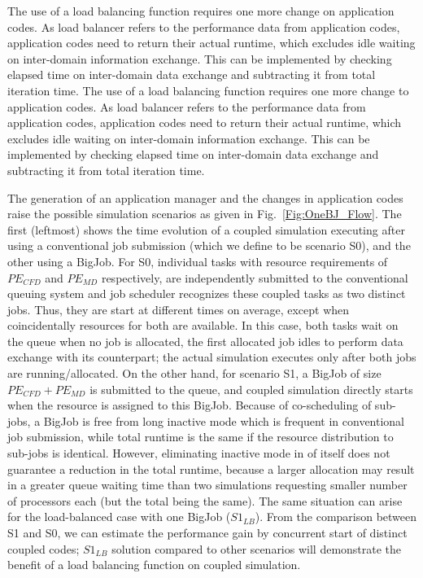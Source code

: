 \documentclass[conference,final]{IEEEtran}
\begin{document}
The use of a load balancing function requires one more change on application codes. As load balancer refers to the performance data from application codes, application codes need to return their actual runtime, which excludes idle waiting on inter-domain information exchange. This can be implemented by checking elapsed time on inter-domain data exchange and subtracting it from total iteration time.  The use of a load balancing function requires one more change to application codes. As load balancer refers to the performance data from application codes, application codes need to return their actual runtime, which excludes idle waiting on inter-domain information exchange. This can be implemented by checking elapsed time on inter-domain data exchange and subtracting it from total iteration time.


The generation of an application manager and the changes in application codes raise the possible simulation scenarios as given in Fig.~\ref{Fig:OneBJ_Flow}. The first (leftmost) shows the time evolution of a coupled simulation executing after using a conventional job submission (which we define to be scenario S0), and the other using a BigJob. For S0, individual tasks with resource requirements of $PE_{CFD}$ and $PE_{MD}$ respectively, are independently submitted to the conventional queuing system and job scheduler recognizes these coupled tasks as two distinct jobs. Thus, they are start at different times on average, except when coincidentally resources for both are available. In this case, both tasks wait on the queue when no job is allocated, the first allocated job idles to perform data exchange with its counterpart; the actual simulation executes only after both jobs are running/allocated. On the other hand, for scenario S1, a BigJob of size $PE_{CFD}+PE_{MD}$ is submitted to the queue, and coupled simulation directly starts when the resource is assigned to this BigJob. Because of co-scheduling of sub-jobs, a BigJob is free from long inactive mode which is frequent in conventional job submission, while total runtime is the same if the resource distribution to sub-jobs is identical. However, eliminating inactive mode in of itself does not guarantee a reduction in the total runtime, because a larger allocation may result in a greater queue waiting time than two simulations requesting smaller number of processors each (but the total being the same). The same situation can arise for the load-balanced case with one BigJob ($S1_{LB}$). From the comparison between S1 and S0, we can estimate the performance gain by concurrent start of distinct coupled codes; $S1_{LB}$ solution compared to other scenarios will demonstrate the benefit of a load balancing function on coupled simulation.
\end{document}
